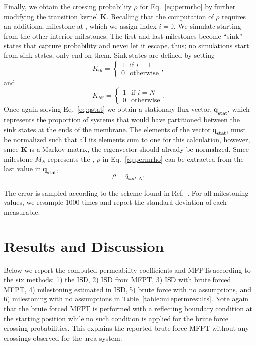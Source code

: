         \par Finally, we obtain the crossing probability $\rho$ for Eq.~\ref{eq:permrho} by further modifying the transition kernel $\mathbf{K}$. Recalling that the computation of $\rho$ requires an additional milestone at , which we assign index $i = 0$. We simulate starting from the other interior milestones. The first and last milestones become ``sink'' states that capture probability and never let it escape, thus; no simulations start from sink states, only end on them. Sink states are defined by setting
        \begin{equation}
            K_{0i} = \begin{cases}
                1 & \text{if } i = 1\\
                0 & \text{otherwise}
            \end{cases},
        \end{equation}
        and
        \begin{equation}
            K_{Ni} = \begin{cases}
                1 & \text{if } i = N\\
                0 & \text{otherwise}
            \end{cases}.
        \end{equation}
        Once again solving Eq.~\ref{eq:qstat} we obtain a stationary flux vector, $\mathbf{q_{stat}}$, which represents the proportion of systems that would have partitioned between the sink states at the ends of the membrane. The elements of the vector $\mathbf{q_{stat}}$, must be normalized such that all its elements sum to one for this calculation, however, since $\mathbf{K}$ is a Markov matrix, the eigenvector should already be normalized. Since milestone $M_N$ represents the , $\rho$ in Eq.~\ref{eq:permrho} can be extracted from the last value in $\mathbf{q_{stat}}$,
        \begin{equation}
            \rho = q_{stat,N}.
        \end{equation}

        \par The error is sampled according to the scheme found in Ref.~. For all milestoning values, we resample 1000 times and report the standard deviation of each measurable.
\clearpage{}

    \clearpage{}\section*{Results and Discussion}
    \par Below we report the computed permeability coefficients and MFPTs according to the six methods: 1) the ISD, 2) ISD from MFPT, 3) ISD with brute forced MFPT, 4) milestoning estimated \mfpt in ISD, 5) brute force with no assumptions, and 6) milestoning with no assumptions in Table~\ref{table:milepermresults}. Note again that the brute forced MFPT is performed with a reflecting boundary condition at the starting position while no such condition is applied for the brute force crossing probabilities. This explains the reported brute force MFPT without any crossings observed for the urea system.


